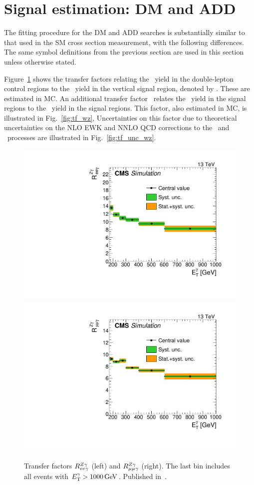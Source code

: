 \section{Signal estimation: DM and ADD} \label{sec:signal_extraction_DM_ADD}
The fitting procedure for the DM and ADD searches is substantially similar to that used in the SM cross section measurement, with the following differences.
The same symbol definitions from the previous section are used in this section unless otherwise stated.

Figure~\ref{fig:tf_zll} shows the transfer factors relating the \zllg\ yield in the double-lepton control regions to the \zinvg\ yield in the
vertical signal region, denoted by \RZll[,j]. These are estimated in MC.
An additional transfer factor \fZW\ relates the \zinvg\ yield
in the signal regions to the \wlng\ yield in the signal regions. This factor, also estimated in MC, is illustrated in Fig.~\ref{fig:tf_wz},
Uncertainties on this factor due to theoretical uncertainties on the NLO EWK and NNLO QCD corrections to the \zinvg\ and \wlng\ processes are illustrated
in Fig.~\ref{fig:tf_unc_wz}.

\begin{figure}[htbp]
  \begin{center}
    \includegraphics[width=0.48\linewidth]{Figures/exo16053/Figure_002-a}
    \includegraphics[width=0.48\linewidth]{Figures/exo16053/Figure_002-b}
    \caption{
          Transfer factors $R^{\PZ\Pgamma}_{\Pe\Pe\Pgamma}$ (left) and $R^{\PZ\Pgamma}_{\Pmu\Pmu\Pgamma}$ (right). The last bin includes all events with $\ETgamma > 1000\unit{GeV}$.
          Published in~\cite{ref:JHEP02(2019)074}.
    }
    \label{fig:tf_zll}
  \end{center}
\end{figure}

